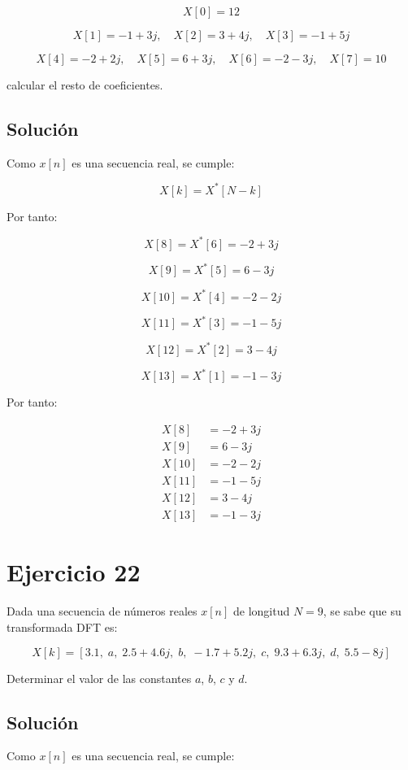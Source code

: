 \documentclass[fleqn]{article}
\begin{document}
	\[
	X[0]=12
	\]

	\[
	X[1]=-1+3j,\quad
	X[2]=3+4j,\quad
	X[3]=-1+5j
	\]

	\[
	X[4]=-2+2j,\quad
	X[5]=6+3j,\quad
	X[6]=-2-3j,\quad
	X[7]=10
	\]

	calcular el resto de coeficientes.

	\subsection{Solución}

	Como $x[n]$ es una secuencia real, se cumple:

	\[
	X[k]
	=
	X^*[N-k]
	\]

	Por tanto:

	\[
	X[8]
	=
	X^*[6]
	=
-2+3j
	\]

	\[
	X[9]
	=
	X^*[5]
	=
	6-3j
	\]

	\[
	X[10]
	=
	X^*[4]
	=
	-2-2j
	\]

	\[
	X[11]
	=
	X^*[3]
	=
	-1-5j
	\]

	\[
	X[12]
	=
	X^*[2]
	=
	3-4j
	\]

	\[
	X[13]
	=
	X^*[1]
	=
	-1-3j
	\]

	Por tanto:

	\[
	\boxed{
	\begin{aligned}
	X[8]&=-2+3j \\
	X[9]&=6-3j \\
	X[10]&=-2-2j \\
	X[11]&=-1-5j \\
	X[12]&=3-4j \\
	X[13]&=-1-3j
	\end{aligned}
	}
	\]

\section{Ejercicio 22}
	Dada una secuencia de números reales $x[n]$ de longitud $N=9$, se sabe que su transformada DFT es:

	\[
	X[k]
	=
	[3.1,\;a,\;2.5+4.6j,\;b,\;-1.7+5.2j,\;c,\;9.3+6.3j,\;d,\;5.5-8j]
	\]

	Determinar el valor de las constantes $a$, $b$, $c$ y $d$.

	\subsection{Solución}

	Como $x[n]$ es una secuencia real, se cumple:
\end{document}
